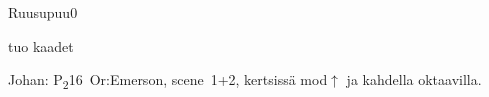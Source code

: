 \documentclass[12pt,a4paper]{article}
\begin{document}
\begin{mysong}{Ruusupuu}{0}
\begin{SBChorus}
  tuo kaadet  
 
\end{SBChorus}

\begin{SBVerse*}
    
       
  
\end{SBVerse*}


{\SBLyricNoteFont Johan: P\textsubscript{2}16~Or:Emerson, scene~1+2, kertsissä
mod$\uparrow$ ja kahdella oktaavilla.}

\end{mysong}
\end{document}
